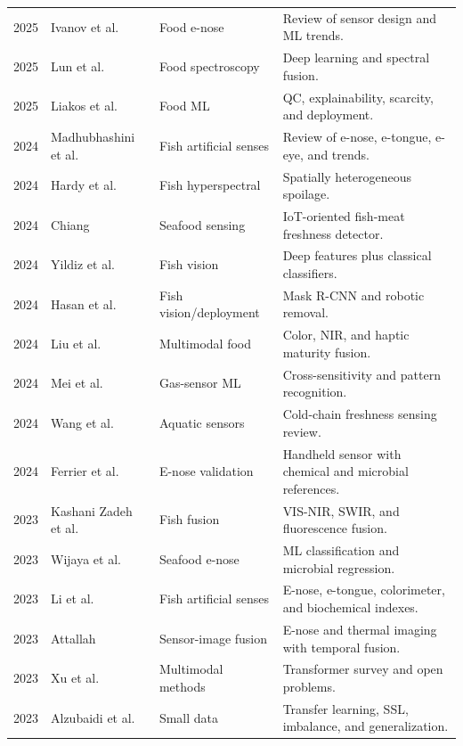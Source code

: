 \documentclass[11pt]{article}
\begin{document}
\begin{longtable}{P{0.06\textwidth}P{0.31\textwidth}P{0.16\textwidth}P{0.37\textwidth}}
2025 & Ivanov et al. \citep{Ivanov2025modern} & Food e-nose & Review of sensor design and ML trends.\\
2025 & Lun et al. \citep{Lun2025deep} & Food spectroscopy & Deep learning and spectral fusion.\\
2025 & Liakos et al. \citep{Liakos2025machine} & Food ML & QC, explainability, scarcity, and deployment.\\
2024 & Madhubhashini et al. \citep{Madhubhashini2024current} & Fish artificial senses & Review of e-nose, e-tongue, e-eye, and trends.\\
2024 & Hardy et al. \citep{Hardy2024does} & Fish hyperspectral & Spatially heterogeneous spoilage.\\
2024 & Chiang \citep{Chiang2024fish} & Seafood sensing & IoT-oriented fish-meat freshness detector.\\
2024 & Yildiz et al. \citep{Yildiz2024fisheye} & Fish vision & Deep features plus classical classifiers.\\
2024 & Hasan et al. \citep{Hasan2024framework} & Fish vision/deployment & Mask R-CNN and robotic removal.\\
2024 & Liu et al. \citep{Liu2024development} & Multimodal food & Color, NIR, and haptic maturity fusion.\\
2024 & Mei et al. \citep{Mei2024overcoming} & Gas-sensor ML & Cross-sensitivity and pattern recognition.\\
2024 & Wang et al. \citep{Wang2024review} & Aquatic sensors & Cold-chain freshness sensing review.\\
2024 & Ferrier et al. \citep{Ferrier2024application} & E-nose validation & Handheld sensor with chemical and microbial references.\\
2023 & Kashani Zadeh et al. \citep{KashaniZadeh2023rapid} & Fish fusion & VIS-NIR, SWIR, and fluorescence fusion.\\
2023 & Wijaya et al. \citep{Wijaya2023seafood} & Seafood e-nose & ML classification and microbial regression.\\
2023 & Li et al. \citep{Li2023prediction} & Fish artificial senses & E-nose, e-tongue, colorimeter, and biochemical indexes.\\
2023 & Attallah \citep{Attallah2023multitask} & Sensor-image fusion & E-nose and thermal imaging with temporal fusion.\\
2023 & Xu et al. \citep{Xu2023multimodal} & Multimodal methods & Transformer survey and open problems.\\
2023 & Alzubaidi et al. \citep{Alzubaidi2023survey} & Small data & Transfer learning, SSL, imbalance, and generalization.\\

\end{longtable}
\end{document}
